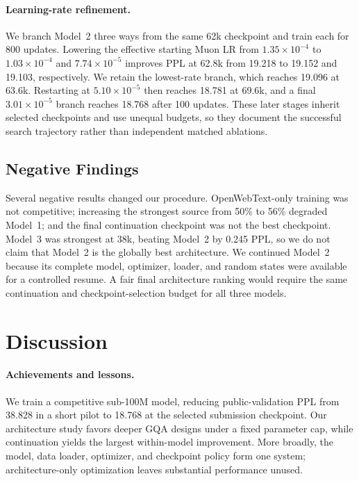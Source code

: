 \documentclass{article}
\begin{document}
\paragraph{Learning-rate refinement.}
We branch Model~2 three ways from the same 62k checkpoint and train each for
800 updates. Lowering the effective starting Muon LR from
$1.35{\times}10^{-4}$ to $1.03{\times}10^{-4}$ and
$7.74{\times}10^{-5}$ improves PPL at 62.8k from 19.218 to 19.152 and 19.103,
respectively. We retain the lowest-rate branch, which reaches 19.096 at 63.6k.
Restarting at $5.10{\times}10^{-5}$ then reaches 18.781 at 69.6k, and a final
$3.01{\times}10^{-5}$ branch reaches 18.768 after 100 updates. These later
stages inherit selected checkpoints and use unequal budgets, so they document
the successful search trajectory rather than independent matched ablations.

\subsection{Negative Findings}

Several negative results changed our procedure. OpenWebText-only training was
not competitive; increasing the strongest source from 50\% to 56\% degraded
Model~1; and the final continuation checkpoint was not the best checkpoint.
Model~3 was strongest at 38k, beating Model~2 by 0.245 PPL, so we do not claim
that Model~2 is the globally best architecture. We continued Model~2 because
its complete model, optimizer, loader, and random states were available for a
controlled resume. A fair final architecture ranking would require the same
continuation and checkpoint-selection budget for all three models.

\section{Discussion}
\label{sec:discussion}

\paragraph{Achievements and lessons.}
We train a competitive sub-100M model, reducing public-validation PPL from
38.828 in a short pilot to 18.768 at the selected submission checkpoint. Our
architecture study favors deeper GQA designs under a fixed parameter cap,
while continuation yields the largest within-model improvement. More broadly,
the model, data loader, optimizer, and checkpoint policy form one system;
architecture-only optimization leaves substantial performance unused.
\end{document}
